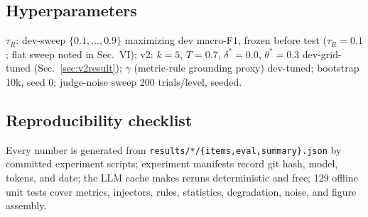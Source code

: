 \documentclass[conference]{IEEEtran}
\begin{document}
\subsection{Hyperparameters}
$\tau_R$: dev-sweep $\{0.1,\dots,0.9\}$ maximizing dev macro-F1, frozen
before test ($\tau_R{=}0.1$; flat sweep noted in Sec.~VI); v2: $k{=}5$,
$T{=}0.7$, $\delta^*{=}0.0$, $\theta^*{=}0.3$ dev-grid-tuned
(Sec.~\ref{sec:v2result}); $\gamma$ (metric-rule
grounding proxy) dev-tuned; bootstrap 10k, seed 0; judge-noise sweep
200 trials/level, seeded.

\subsection{Reproducibility checklist}
Every number is generated from \texttt{results/*/\{items,eval,summary\}.json}
by committed experiment scripts; experiment manifests record git hash, model,
tokens, and date; the LLM cache makes reruns deterministic and free; 129
offline unit tests cover metrics, injectors, rules, statistics, degradation,
noise, and figure assembly.
\end{document}
